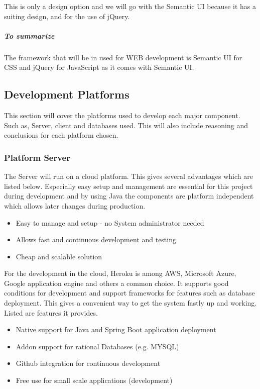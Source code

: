\documentclass[a4paper,11pt]{article}
\begin{document}
\noindent This is only a design option and we will go with the Semantic UI because it has a suiting design, and for the use of jQuery. 

\subparagraph{To summarize}\label{to-summarize}
The framework that will be in used for WEB development is Semantic UI
for CSS and jQuery for JavaScript as it comes with Semantic UI.

\subsection{Development Platforms}
This section will cover the platforms used to develop each major component. Such as, Server, client and databases used. This will also include reasoning and conclusions for each platform chosen.

\subsubsection{Platform Server}
The Server will run on a cloud platform. This gives several advantages which are listed below. Especially easy setup and management are essential for this project during development and by using Java the components are platform independent which allows later changes during production.
\begin{itemize}
\item Easy to manage and setup - no System administrator needed
\item Allows fast and continuous development and testing
\item Cheap and scalable solution
\end{itemize}

For the development in the cloud, Heroku is among AWS, Microsoft Azure, Google application engine and others a common choice. It supports good conditions for development and support frameworks for features such as database deployment. This gives a convenient way to get the system fastly up and working. Listed are features it provides.
\begin{itemize}
\item Native support for Java and Spring Boot application deployment
\item Addon support for rational Databases (e.g. MYSQL)
\item Github integration for continuous development
\item Free use for small scale applications (development)
\end{itemize}
\end{document}
